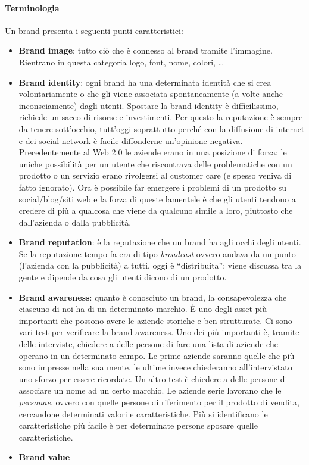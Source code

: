 \paragraph*{Terminologia} Un brand presenta i seguenti punti caratteristici:
\begin{itemize}
 \item \textbf{Brand image}: tutto ciò che è connesso al brand tramite
 l'immagine. Rientrano in questa categoria logo, font, nome, colori, \dots{}
 \item \textbf{Brand identity}: ogni brand ha una determinata identità che si
 crea volontariamente o che gli viene associata spontaneamente (a volte anche
 inconsciamente) dagli utenti.
 Spostare la brand identity è difficilissimo, richiede un sacco di risorse e
 investimenti.
 Per questo la reputazione è sempre da tenere sott'occhio, tutt'oggi soprattutto
 perché con la diffusione di internet e dei social network è facile diffonderne
 un'opinione negativa.
 Precedentemente al Web 2.0 le aziende erano in una posizione di forza: le
 uniche possibilità per un utente che riscontrava delle problematiche con un
 prodotto o un servizio erano rivolgersi al customer care (e spesso veniva
 di fatto ignorato). Ora è possibile far emergere i problemi di un prodotto su
 social/blog/siti web e la forza di queste lamentele è che gli utenti tendono a
 credere di più a qualcosa che viene da qualcuno simile a loro, piuttosto che
 dall'azienda o dalla pubblicità.
 \item \textbf{Brand reputation}: è la reputazione che un brand ha agli occhi
 degli utenti. Se la reputazione tempo fa era di tipo \textit{broadcast} ovvero
 andava da un punto (l'azienda con la pubblicità) a tutti, oggi è
 ``distribuita'': viene discussa tra la gente e dipende da cosa gli utenti
 dicono di un prodotto.
 \item \textbf{Brand awareness}: quanto è conosciuto un brand, la
 consapevolezza che ciascuno di noi ha di un determinato marchio.
 È uno degli asset più importanti che possono avere le aziende storiche e ben
 strutturate.
 Ci sono vari test per verificare la brand awareness. Uno dei più importanti è,
 tramite delle interviste, chiedere a delle persone di fare una lista di
 aziende che operano in un determinato campo. Le prime aziende saranno quelle
 che più sono impresse nella sua mente, le ultime invece chiederanno
 all'intervistato uno sforzo per essere ricordate. Un altro test è chiedere a
 delle persone di associare un nome ad un certo marchio.
 Le aziende serie lavorano che le \textit{personae}, ovvero con quelle persone
 di riferimento per il prodotto di vendita, cercandone determinati valori e
 caratteristiche.
 Più si identificano le caratteristiche più facile è per determinate persone
 sposare quelle caratteristiche.
 \item \textbf{Brand value}
\end{itemize}
